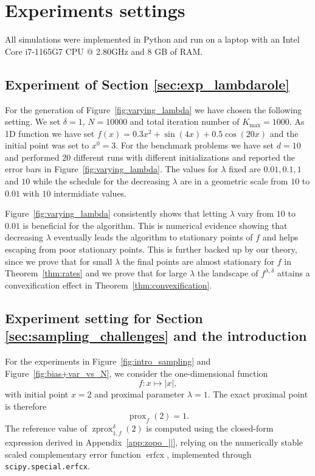 \documentclass{article}
\newcommand{\prox}{\ensuremath{\operatorname{prox}}}
\newcommand{\zprox}{\ensuremath{\operatorname{zprox}}}
\begin{document}
\section{Experiments settings}\label{app:exp_setting}

All simulations were implemented in Python and run on a laptop with an Intel Core i7-1165G7 CPU @ 2.80GHz and 8 GB of RAM.

\subsection{Experiment of Section \ref{sec:exp_lambdarole}}\label{app:exp_setting_lambda} For the generation of Figure~\ref{fig:varying_lambda} we have chosen the following setting. We set $\delta = 1$, $N = 10000$ and total iteration number of $K_{\max}=1000$. As 1D function we have set $f(x) = 0.3 x^2 + \sin(4x) + 0.5 \cos(20x)$ and the initial point was set to $x^0=3$. For the benchmark problems we have set $d=10$ and performed $20$ different runs with different initializations and reported the error bars in Figure~\ref{fig:varying_lambda}. The values for $\lambda$ fixed are $0.01, 0.1, 1$ and $10$ while the schedule for the decreasing $\lambda$ are in a geometric scale from $10$ to $0.01$ with $10$ intermidiate values.

Figure~\ref{fig:varying_lambda} consistently shows that letting $\lambda$ vary from $10$ to $0.01$ is beneficial for the algorithm. This is numerical evidence showing that decreasing $\lambda$ eventually leads the algorithm to stationary points of $f$ and helps escaping from poor stationary points. This is further backed up by our theory, since we prove that for small $\lambda$ the final points are almost stationary for $f$ in Theorem~\ref{thm:rates} and we prove that for large $\lambda$ the landscape of $f^{\lambda,\delta}$ attains a convexification effect in Theorem~\ref{thm:convexification}.

\subsection{Experiment setting for Section \ref{sec:sampling_challenges} and the introduction}\label{app:exp_setting_delta}

For the experiments in Figure~\ref{fig:intro_sampling} and Figure~\ref{fig:bias+var_vs_N}, we consider the one-dimensional function
\[
    f:x\mapsto |x|,
\]
with initial point \(x=2\) and proximal parameter \(\lambda=1\). The exact proximal point is therefore
\[
    \prox_f(2)=1.
\]
The reference value of \(\zprox^\delta_{1,f}(2)\) is computed using the closed-form expression derived in Appendix~\ref{app:zopo_||}, relying on the numerically stable scaled complementary error function \(\operatorname{erfcx}\), implemented through \texttt{scipy.special.erfcx}.
\end{document}
